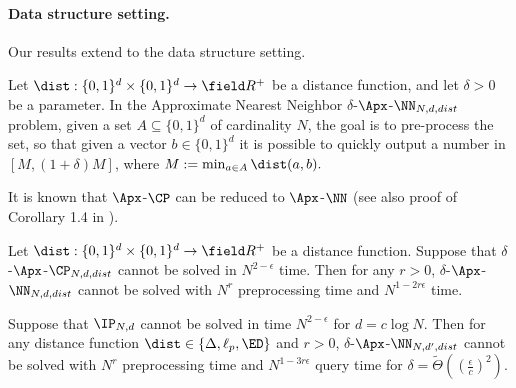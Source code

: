 \documentclass[11pt]{article}
\begin{document}
\paragraph{Data structure setting.}
Our results extend to the data structure setting.
\begin{defn} 
    Let $\dist:\{0,1\}^d \times\{0,1\}^d \to\field R^+$ be a distance function, and let $\delta > 0$ be a parameter. In the \textsf{Approximate Nearest Neighbor $\delta$-$\Apx$-$\NN_{N,d,dist}$ problem}, given a set $A\subseteq\{0,1\}^d$ of cardinality $N$, the goal is to pre-process the set, so that given a vector $b\in\{0,1\}^d$ it is possible to quickly output a number in $[M, (1+\delta)M]$, where $M:=\min_{a \in A} \dist(a,b).$
\end{defn}

It is known that $\Apx$-$\CP$ can be reduced to $\Apx$-$\NN$ \cite{WW18} (see also proof of Corollary 1.4 in \cite{ARW17}).

\begin{lem} \label{lem:CPtoANN}
    Let $\dist:\{0,1\}^d \times\{0,1\}^d \to\field R^+$ be a distance function. Suppose that $\delta$-$\Apx$-$\CP_{N, d, dist}$ cannot be solved in $N^{2-\epsilon}$ time. Then for any $r>0$, $\delta$-$\Apx$-$\NN_{N,d, dist}$ cannot be solved with $N^r$ preprocessing time and $N^{1-2r\epsilon}$ time.
\end{lem}


\begin{cor}
Suppose that $\IP_{N,d}$ cannot be solved in time $N^{2-\epsilon}$ for $d = c \log N$. Then for any distance function $\dist \in \{\Delta,\ell_p,\ED\}$ and $r>0$, $\delta$-$\Apx$-$\NN_{N,d',dist}$ cannot be solved with $N^r$ preprocessing time and $N^{1-3r\epsilon}$ query time for $\delta = \tilde \Theta (( \frac \epsilon c)^2)$.
\end{cor}







 

\end{document}
